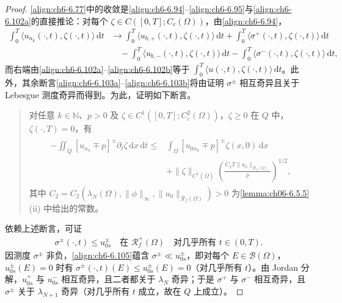 \documentclass[../../main.tex]{subfiles}%
\begin{document}
\begin{proof}
\eqref{align:ch6-6.77}中的收敛是\eqref{align:ch6-6.94}--\eqref{align:ch6-6.95}与\eqref{align:ch6-6.102a}的直接推论：对每个 $\zeta\in C([0,T];C_c(\Omega))$，由\eqref{align:ch6-6.94}，
\begin{align*}
\int_0^T\langle u_{n_k}(\cdot,t),\zeta(\cdot,t)\rangle\,\mathrm{d}t
&\to\int_0^T\langle u_{b,+}(\cdot,t),\zeta(\cdot,t)\rangle\,\mathrm{d}t
+\int_0^T\langle\sigma^+(\cdot,t),\zeta(\cdot,t)\rangle\,\mathrm{d}t\\
&\quad-\int_0^T\langle u_{b,-}(\cdot,t),\zeta(\cdot,t)\rangle\,\mathrm{d}t
-\int_0^T\langle\sigma^-(\cdot,t),\zeta(\cdot,t)\rangle\,\mathrm{d}t,
\end{align*}
而右端由\eqref{align:ch6-6.102a}--\eqref{align:ch6-6.102b}等于 $\int_0^T\langle u(\cdot,t),\zeta(\cdot,t)\rangle\,\mathrm{d}t$。此外，其余断言\eqref{align:ch6-6.103a}--\eqref{align:ch6-6.103b}将由证明 $\sigma^\pm$ 相互奇异且关于 Lebesgue 测度奇异而得到。为此，证明如下断言。

\begin{quote}
对任意 $k\in\mathbb{N}$、$p>0$ 及 $\zeta\in C^1([0,T];C^2_c(\Omega))$，$\zeta\geqslant0$ 在 $Q$ 中，$\zeta(\cdot,T)=0$，有
\begin{align}
\begin{aligned}
-\iint_Q[u_{n_k}\mp p]^\pm\partial_t\zeta\,\mathrm{d}x\,\mathrm{d}t
\leqslant{}&\int_\Omega[u_{0n_k}\mp p]^\pm\zeta(x,0)\,\mathrm{d}x\\
&+\|\zeta\|_{C^1(\overline\Omega)}\left(\frac{C_2T\|u_0\|_{\mathscr{R}_f(\Omega)}}{p}\right)^{1/2},
\end{aligned} 
\label{align:ch6-6.104}
\end{align}
其中 $C_2=C_2(\lambda_N(\Omega),\|\phi\|_\infty,\|u_0\|_{\mathscr{R}_f(\Omega)})>0$ 为\cref{lemma:ch06-6.5.5}(ii) 中给出的常数。
\end{quote}

依赖上述断言，可证
\begin{align}
\sigma^\pm(\cdot,t)\leqslant u^\pm_{0s} \quad\text{在 }\mathscr{R}^+_f(\Omega)
\quad\text{对几乎所有 }t\in(0,T). \label{align:ch6-6.105}
\end{align}
因测度 $\sigma^\pm$ 非负，\eqref{align:ch6-6.105}蕴含 $\sigma^\pm\ll u^\pm_{0s}$，即对每个 $E\in\mathscr{B}(\Omega)$，$u^\pm_{0s}(E)=0$ 时有 $\sigma^\pm(\cdot,t)(E)\leqslant u^\pm_{0s}(E)=0$（对几乎所有 $t$）。由 Jordan 分解，$u^+_{0s}$ 与 $u^-_{0s}$ 相互奇异，且二者都关于 $\lambda_N$ 奇异；于是 $\sigma^+$ 与 $\sigma^-$ 相互奇异，且 $\sigma^\pm$ 关于 $\lambda_{N+1}$ 奇异（对几乎所有 $t$ 成立，故在 $Q$ 上成立）。


\end{proof}
\end{document}
